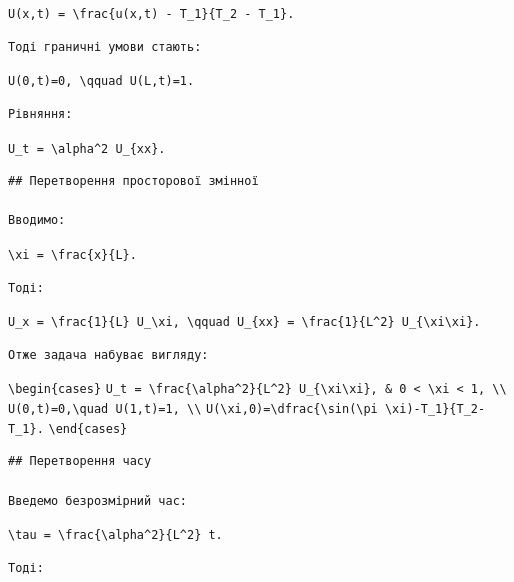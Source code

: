 \documentclass[
  ukrainian,
]{article}
\begin{document}
\texttt{U(x,t)\ =\ \textbackslash{}frac\{u(x,t)\ -\ T\_1\}\{T\_2\ -\ T\_1\}.}

\begin{verbatim}
Тоді граничні умови стають:
\end{verbatim}

\texttt{U(0,t)=0,\ \textbackslash{}qquad\ U(L,t)=1.}

\begin{verbatim}
Рівняння:
\end{verbatim}

\texttt{U\_t\ =\ \textbackslash{}alpha\^{}2\ U\_\{xx\}.}

\begin{verbatim}
## Перетворення просторової змінної

Вводимо:
\end{verbatim}

\texttt{\textbackslash{}xi\ =\ \textbackslash{}frac\{x\}\{L\}.}

\begin{verbatim}
Тоді:
\end{verbatim}

\texttt{U\_x\ =\ \textbackslash{}frac\{1\}\{L\}\ U\_\textbackslash{}xi,\ \textbackslash{}qquad\ U\_\{xx\}\ =\ \textbackslash{}frac\{1\}\{L\^{}2\}\ U\_\{\textbackslash{}xi\textbackslash{}xi\}.}

\begin{verbatim}
Отже задача набуває вигляду:
\end{verbatim}

\texttt{\textbackslash{}begin\{cases\}}
\texttt{U\_t\ =\ \textbackslash{}frac\{\textbackslash{}alpha\^{}2\}\{L\^{}2\}\ U\_\{\textbackslash{}xi\textbackslash{}xi\},\ \&\ 0\ \textless{}\ \textbackslash{}xi\ \textless{}\ 1,\ \textbackslash{}\textbackslash{}}
\texttt{U(0,t)=0,\textbackslash{}quad\ U(1,t)=1,\ \textbackslash{}\textbackslash{}}
\texttt{U(\textbackslash{}xi,0)=\textbackslash{}dfrac\{\textbackslash{}sin(\textbackslash{}pi\ \textbackslash{}xi)-T\_1\}\{T\_2-T\_1\}.}
\texttt{\textbackslash{}end\{cases\}}

\begin{verbatim}
## Перетворення часу

Введемо безрозмірний час:
\end{verbatim}

\texttt{\textbackslash{}tau\ =\ \textbackslash{}frac\{\textbackslash{}alpha\^{}2\}\{L\^{}2\}\ t.}

\begin{verbatim}
Тоді:
\end{verbatim}
\end{document}
